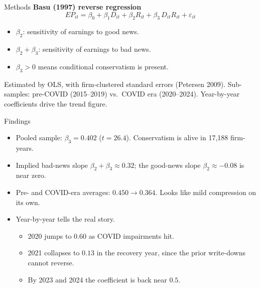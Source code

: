 \documentclass[11pt,aspectratio=169]{beamer}
\begin{document}
\begin{frame}{Methods}
  \textbf{Basu (1997) reverse regression}
  \begin{equation*}
    EP_{it} = \beta_0 + \beta_1 D_{it} + \beta_2 R_{it}
            + \boxed{\beta_3} \, D_{it} R_{it} + \varepsilon_{it}
  \end{equation*}
  \begin{itemize}
    \item $\beta_2$: sensitivity of earnings to good news.
    \item $\beta_2 + \beta_3$: sensitivity of earnings to bad news.
    \item $\beta_3 > 0$ means conditional conservatism is present.
  \end{itemize}

  \medskip
  Estimated by OLS, with firm-clustered standard errors (Petersen 2009).
  Sub-samples: pre-COVID (2015--2019) vs.\ COVID era (2020--2024).
  Year-by-year coefficients drive the trend figure.
\end{frame}

\begin{frame}{Findings}
  \begin{itemize}
    \item Pooled sample: $\beta_3 = 0.402$ ($t=26.4$). Conservatism is
          alive in 17{,}188 firm-years.
    \item Implied bad-news slope $\beta_2 + \beta_3 \approx 0.32$;
          the good-news slope $\beta_2 \approx -0.08$ is near zero.
    \item Pre- and COVID-era averages: $0.450 \to 0.364$. Looks like
          mild compression on its own.
    \item Year-by-year tells the real story.
          \begin{itemize}
            \item 2020 jumps to $0.60$ as COVID impairments hit.
            \item 2021 collapses to $0.13$ in the recovery year, since
                  the prior write-downs cannot reverse.
            \item By 2023 and 2024 the coefficient is back near $0.5$.
          \end{itemize}
  \end{itemize}
\end{frame}
\end{document}
